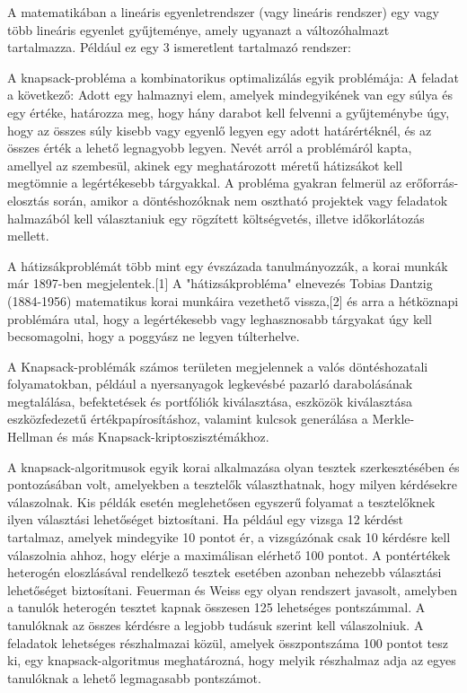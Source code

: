 	
	A matematikában a lineáris egyenletrendszer (vagy lineáris rendszer) egy vagy több lineáris egyenlet gyűjteménye, amely ugyanazt a változóhalmazt tartalmazza. Például ez egy 3 ismeretlent tartalmazó rendszer:
	
	
	
	
	A knapsack-probléma a kombinatorikus optimalizálás egyik problémája: A feladat a következő: Adott egy halmaznyi elem, amelyek mindegyikének van egy súlya és egy értéke, határozza meg, hogy hány darabot kell felvenni a gyűjteménybe úgy, hogy az összes súly kisebb vagy egyenlő legyen egy adott határértéknél, és az összes érték a lehető legnagyobb legyen. Nevét arról a problémáról kapta, amellyel az szembesül, akinek egy meghatározott méretű hátizsákot kell megtömnie a legértékesebb tárgyakkal. A probléma gyakran felmerül az erőforrás-elosztás során, amikor a döntéshozóknak nem osztható projektek vagy feladatok halmazából kell választaniuk egy rögzített költségvetés, illetve időkorlátozás mellett.
	
	A hátizsákproblémát több mint egy évszázada tanulmányozzák, a korai munkák már 1897-ben megjelentek.[1] A "hátizsákprobléma" elnevezés Tobias Dantzig (1884-1956) matematikus korai munkáira vezethető vissza,[2] és arra a hétköznapi problémára utal, hogy a legértékesebb vagy leghasznosabb tárgyakat úgy kell becsomagolni, hogy a poggyász ne legyen túlterhelve. 
	
	
	A Knapsack-problémák számos területen megjelennek a valós döntéshozatali folyamatokban, például a nyersanyagok legkevésbé pazarló darabolásának megtalálása, befektetések és portfóliók kiválasztása, eszközök kiválasztása eszközfedezetű értékpapírosításhoz, valamint kulcsok generálása a Merkle-Hellman és más Knapsack-krip\-to\-szisz\-té\-mák\-hoz.
	
	A knapsack-algoritmusok egyik korai alkalmazása olyan tesztek szerkesztésében és pontozásában volt, amelyekben a tesztelők választhatnak, hogy milyen kérdésekre válaszolnak. Kis példák esetén meglehetősen egyszerű folyamat a tesztelőknek ilyen választási lehetőséget biztosítani. Ha például egy vizsga 12 kérdést tartalmaz, amelyek mindegyike 10 pontot ér, a vizsgázónak csak 10 kérdésre kell válaszolnia ahhoz, hogy elérje a maximálisan elérhető 100 pontot. A pontértékek heterogén eloszlásával rendelkező tesztek esetében azonban nehezebb választási lehetőséget biztosítani. Feuerman és Weiss egy olyan rendszert javasolt, amelyben a tanulók heterogén tesztet kapnak összesen 125 lehetséges pontszámmal. A tanulóknak az összes kérdésre a legjobb tudásuk szerint kell válaszolniuk. A feladatok lehetséges részhalmazai közül, amelyek összpontszáma 100 pontot tesz ki, egy knapsack-algoritmus meghatározná, hogy melyik részhalmaz adja az egyes tanulóknak a lehető legmagasabb pontszámot.
	
